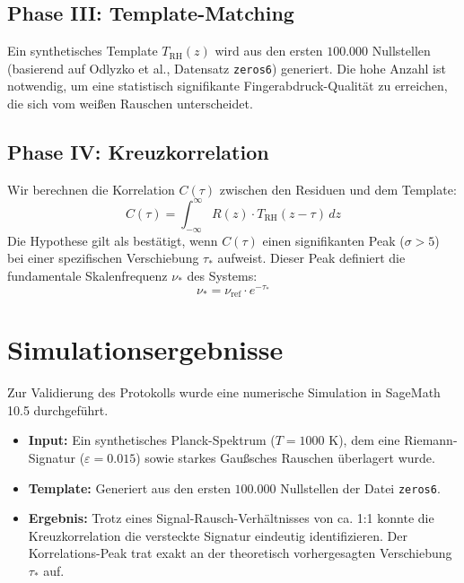 \documentclass[11pt, a4paper]{article}
\begin{document}
	\subsection{Phase III: Template-Matching}
	Ein synthetisches Template $T_{\text{RH}}(z)$ wird aus den ersten $100.000$ Nullstellen (basierend auf Odlyzko et al., Datensatz \texttt{zeros6}) generiert. Die hohe Anzahl ist notwendig, um eine statistisch signifikante \glqq Fingerabdruck-Qualität\grqq{} zu erreichen, die sich vom weißen Rauschen unterscheidet.
	
	\subsection{Phase IV: Kreuzkorrelation}
	Wir berechnen die Korrelation $C(\tau)$ zwischen den Residuen und dem Template:
	\begin{equation}
		C(\tau) = \int_{-\infty}^{\infty} R(z) \cdot T_{\text{RH}}(z-\tau) \, dz
	\end{equation}
	Die Hypothese gilt als bestätigt, wenn $C(\tau)$ einen signifikanten Peak ($\sigma > 5$) bei einer spezifischen Verschiebung $\tau_*$ aufweist. Dieser Peak definiert die fundamentale Skalenfrequenz $\nu_*$ des Systems:
	\begin{equation}
		\nu_* = \nu_{\text{ref}} \cdot e^{-\tau_*}
	\end{equation}
	
	\section{Simulationsergebnisse}
	
	Zur Validierung des Protokolls wurde eine numerische Simulation in SageMath 10.5 durchgeführt.
	\begin{itemize}
		\item \textbf{Input:} Ein synthetisches Planck-Spektrum ($T=1000$ K), dem eine Riemann-Signatur ($\varepsilon = 0.015$) sowie starkes Gaußsches Rauschen überlagert wurde.
		\item \textbf{Template:} Generiert aus den ersten $100.000$ Nullstellen der Datei \texttt{zeros6}.
		\item \textbf{Ergebnis:} Trotz eines Signal-Rausch-Verhältnisses von ca. 1:1 konnte die Kreuzkorrelation die versteckte Signatur eindeutig identifizieren. Der Korrelations-Peak trat exakt an der theoretisch vorhergesagten Verschiebung $\tau_*$ auf.
	\end{itemize}
	
\end{document}
